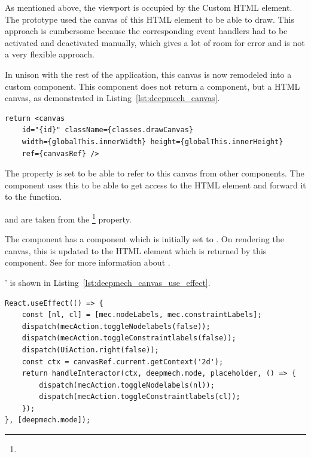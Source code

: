 As mentioned above, the viewport is occupied by the  Custom HTML element.
The prototype used the canvas of this HTML element to be able to draw.
This approach is cumbersome because the corresponding event handlers had to be activated and deactivated manually, which gives a lot of room for error and is not a very flexible approach.

In unison with the rest of the application, this canvas is now remodeled into a custom component.
This  component does not return a  component, but a HTML canvas, as demonstrated in Listing~\ref{lst:deepmech_canvas}.

\begin{lstlisting}[label={lst:deepmech_canvas}, caption={Return of the \code{DeepmechCanvas} component.}]
return <canvas
    id="{id}" className={classes.drawCanvas}
    width={globalThis.innerWidth} height={globalThis.innerHeight}
    ref={canvasRef} />
\end{lstlisting}

The  property is set to be able to refer to this canvas from other components.
The  component uses this  to be able to get access to the HTML element and forward it to the  function.

 and  are taken from the \footnote{} property.

The  component has a  component which is initially set to .
On rendering the canvas, this is updated to the HTML element which is returned by this component.
See  for more information about .

'  is shown in Listing~\ref{lst:deepmech_canvas_use_effect}.

\begin{lstlisting}[label={lst:deepmech_canvas_use_effect}, caption={The \code{useEffect} function in the \code{DeepmechCanvas} component.}]
React.useEffect(() => {
    const [nl, cl] = [mec.nodeLabels, mec.constraintLabels];
    dispatch(mecAction.toggleNodelabels(false));
    dispatch(mecAction.toggleConstraintlabels(false));
    dispatch(UiAction.right(false));
    const ctx = canvasRef.current.getContext('2d');
    return handleInteractor(ctx, deepmech.mode, placeholder, () => {
        dispatch(mecAction.toggleNodelabels(nl));
        dispatch(mecAction.toggleConstraintlabels(cl));
    });
}, [deepmech.mode]);
\end{lstlisting}

